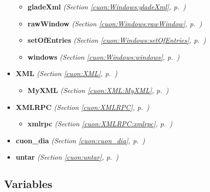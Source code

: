 \begin{itemize}
\begin{itemize}
    \item \textbf{gladeXml}
  \textit{(Section \ref{cuon:Windows:gladeXml}, p.~\pageref{cuon:Windows:gladeXml})}

    \item \textbf{rawWindow}
  \textit{(Section \ref{cuon:Windows:rawWindow}, p.~\pageref{cuon:Windows:rawWindow})}

    \item \textbf{setOfEntries}
  \textit{(Section \ref{cuon:Windows:setOfEntries}, p.~\pageref{cuon:Windows:setOfEntries})}

    \item \textbf{windows}
  \textit{(Section \ref{cuon:Windows:windows}, p.~\pageref{cuon:Windows:windows})}

  \end{itemize}
\item \textbf{XML}
  \textit{(Section \ref{cuon:XML}, p.~\pageref{cuon:XML})}

  \begin{itemize}
\setlength{\parskip}{0ex}
    \item \textbf{MyXML}
  \textit{(Section \ref{cuon:XML:MyXML}, p.~\pageref{cuon:XML:MyXML})}

  \end{itemize}
\item \textbf{XMLRPC}
  \textit{(Section \ref{cuon:XMLRPC}, p.~\pageref{cuon:XMLRPC})}

  \begin{itemize}
\setlength{\parskip}{0ex}
    \item \textbf{xmlrpc}
  \textit{(Section \ref{cuon:XMLRPC:xmlrpc}, p.~\pageref{cuon:XMLRPC:xmlrpc})}

  \end{itemize}
\item \textbf{cuon\_dia}
  \textit{(Section \ref{cuon:cuon_dia}, p.~\pageref{cuon:cuon_dia})}

\item \textbf{untar}
  \textit{(Section \ref{cuon:untar}, p.~\pageref{cuon:untar})}

\end{itemize}



  \subsection{Variables}

